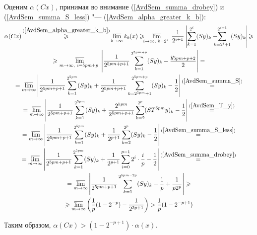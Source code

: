 Оценим $\alpha(Cx)$, принимая во внимание
(\ref{AvdSem_summa_drobey}) и (\ref{AvdSem_summa_S_less}) "---
(\ref{AvdSem_alpha_greater_k_b}):
\begin{multline*}
    \alpha (Cx) \mathop{\geqslant}^{(\ref{AvdSem_alpha_greater_k_b})}
    \varlimsup_{b\to \infty} k_b(x) \geqslant
    \!\!\!
    \varlimsup_{
        i\to \infty,~
        b=2^i~
    }\frac{1}{2^{i+1}}\left|
        \sum_{k=1}^{2^i}(Sy)_k -
        \!\!\!\!\!
        \sum_{k=2^i+1}^{2^{i+1}}(Sy)_k
    \right|
    \!
    \geqslant
    \\ \geqslant
    \varlimsup_{
        m\to \infty,~
        i=5pm+p~
    }\left|
        \frac{1}{2^{5pm+p+1}}\sum_{k=1}^{2^{5pm+p}}(Sy)_k - \frac{y_{5pm+p+2}}{2}
    \right| =
    \\=
    \varlimsup_{m\to \infty}\left|
        \frac{1}{2^{5pm+p+1}}\sum_{k=1}^{2^{5pm}}(Sy)_k
        +
        \frac{1}{2^{5pm+p+1}}\sum_{k=2^{5pm}+1}^{2^{5pm+p}}(Sy)_k
        - \frac{1}{2}
    \right|
    \mathop{=}^{(\ref{AvdSem_summa_S})}
    \\=
    \varlimsup_{m\to \infty}\left|
        \frac{1}{2^{5pm+p+1}}\sum_{k=1}^{2^{5pm}}(Sy)_k
        +
        \frac{2^{5pm}}{2^{5pm+p+1}} \sum_{k=2}^{2^p}(ST^{5pm}y)_k
        - \frac{1}{2}
    \right|
    \mathop{=}^{(\ref{AvdSem_T_y})}
    \\=
    \varlimsup_{m\to \infty}\left|
        \frac{1}{2^{5pm+p+1}}\sum_{k=1}^{2^{5pm}}(Sy)_k
        +
        \frac{1}{2^{p+1}} \sum_{k=2}^{2^p}(Sy)_k
        - \frac{1}{2}
    \right|
    \mathop{=}^{(\ref{AvdSem_summa_S_less})}
    \\=
    \varlimsup_{m\to \infty}\left|
        \frac{1}{2^{5pm+p+1}}\sum_{k=1}^{2^{5pm}}(Sy)_k
        +
        \frac{1}{2^{p+1}} \sum_{i=0}^{p-1}2^i \cdot \frac{i}{p}
        - \frac{1}{2}
    \right|
    \mathop{=}^{(\ref{AvdSem_summa_drobey})}
    \\=
    \varlimsup_{m\to \infty}\left|
        \frac{1}{2^{5pm+p+1}}\sum_{k=1}^{2^{5pm-2p}}(Sy)_k
        -\frac{1}{p} + \frac{1}{p 2^p}
    \right| \geqslant
    \\ \geqslant
    \varlimsup_{m\to \infty} \left(
        \frac{1}{p} (1-2^{-p})
        - \frac{1}{2^{3p+1}}
    \right) >
    \frac{1}{p} (1-2^{-p+1})
\end{multline*}


Таким образом, $
    \alpha(Cx) >
    (1-2^{-p+1}) \cdot \alpha(x)
$.
